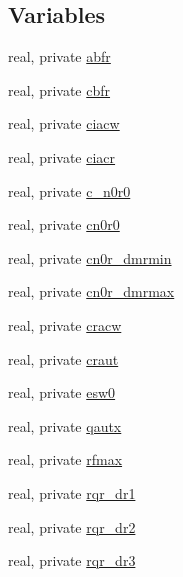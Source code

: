 \subsection*{Variables}
\begin{DoxyCompactItemize}
\item 
real, private \hyperlink{namespacemodule__microphysics_a8f4f8d798ec89d8bb550fa6b6f8eda06}{abfr}
\item 
real, private \hyperlink{namespacemodule__microphysics_afdcb4cd9370ca50745e65221becb6eae}{cbfr}
\item 
real, private \hyperlink{namespacemodule__microphysics_a9e41f7e6287fe7ede81f17b9e041c09e}{ciacw}
\item 
real, private \hyperlink{namespacemodule__microphysics_a1c6192a9baafa2b341b19628e00c19b5}{ciacr}
\item 
real, private \hyperlink{namespacemodule__microphysics_ac36c8de45d04aab21833d22133311284}{c\+\_\+n0r0}
\item 
real, private \hyperlink{namespacemodule__microphysics_a4b8b65e65be09b3e9a5cceca947fc408}{cn0r0}
\item 
real, private \hyperlink{namespacemodule__microphysics_abd42b2566e31b5d29c6f69471cb3ec5d}{cn0r\+\_\+dmrmin}
\item 
real, private \hyperlink{namespacemodule__microphysics_a3757ff5b4210247ec04e08537dfa9696}{cn0r\+\_\+dmrmax}
\item 
real, private \hyperlink{namespacemodule__microphysics_ac2d7886b9a3b896fbfdce0e3bf3b805a}{cracw}
\item 
real, private \hyperlink{namespacemodule__microphysics_aa70387aeb638af57989b45128bfe387d}{craut}
\item 
real, private \hyperlink{namespacemodule__microphysics_a74a1e9686afb4c7b7b7913cf9615ee0c}{esw0}
\item 
real, private \hyperlink{namespacemodule__microphysics_a207d110ab05ae003282c44232b6bb8b1}{qautx}
\item 
real, private \hyperlink{namespacemodule__microphysics_a733f21868223ca01612507355d0b85be}{rfmax}
\item 
real, private \hyperlink{namespacemodule__microphysics_ada6772b0bc7347f6ebb3c31f2df43563}{rqr\+\_\+dr1}
\item 
real, private \hyperlink{namespacemodule__microphysics_ab0d5f615986c3482d2fad8542c4f52b8}{rqr\+\_\+dr2}
\item 
real, private \hyperlink{namespacemodule__microphysics_a1408a4c383136f8beb5d92049a5461a1}{rqr\+\_\+dr3}

\end{DoxyCompactItemize}
